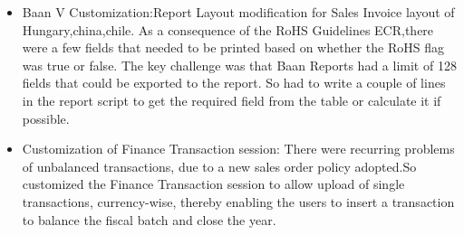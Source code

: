 \begin{itemize}
	 	\item Baan V Customization:Report Layout modification for Sales Invoice layout of Hungary,china,chile. As a consequence of the RoHS Guidelines ECR,there were a few fields that needed to be printed based on whether the RoHS flag was true or false. The key challenge was that Baan Reports had a limit of 128 fields that could be exported to the report. So had to write a couple of lines in the report script to get the required field from the table or calculate it if possible.

		\item Customization of Finance Transaction session: There were recurring problems of unbalanced transactions, due to a new sales order policy adopted.So customized the Finance Transaction session to allow upload of single transactions, currency-wise, thereby enabling the users to insert a transaction to balance the fiscal batch and close the year.
	\end{itemize}
